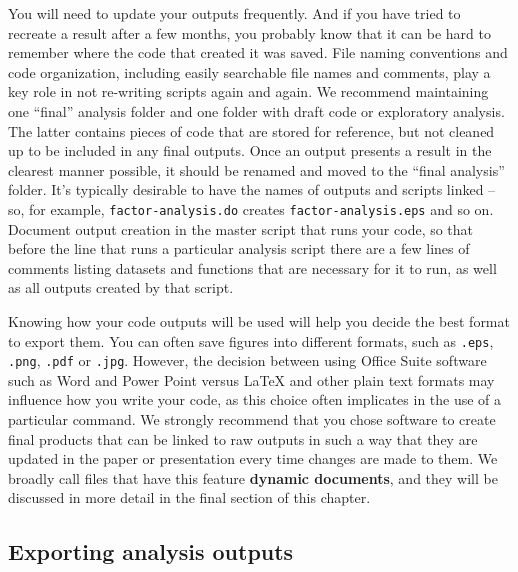 You will need to update your outputs frequently.
And if you have tried to recreate a result after a few months,
you probably know that it can be hard to remember where the code that created it was saved.
File naming conventions and code organization,
including easily searchable file names and comments,
play a key role in not re-writing scripts again and again.
We recommend maintaining one ``final'' analysis folder
and one folder with draft code or exploratory analysis.
The latter contains pieces of code that are stored for reference,
but not cleaned up to be included in any final outputs.
Once an output presents a result in the clearest manner possible,
it should be renamed and moved to the ``final analysis'' folder.
It's typically desirable to have the names of outputs and scripts linked --
so, for example, \texttt{factor-analysis.do} creates \texttt{factor-analysis.eps} and so on.
Document output creation in the master script that runs your code,
so that before the line that runs a particular analysis script
there are a few lines of comments listing
datasets and functions that are necessary for it to run,
as well as all outputs created by that script.

Knowing how your code outputs will be used will help you decide the best format to export them.
You can often save figures into different formats,
such as \texttt{.eps}, \texttt{.png}, \texttt{.pdf} or \texttt{.jpg}.
However, the decision between using Office Suite software such as Word and Power Point
versus {\LaTeX} and other plain text formats may influence how you write your code,
as this choice often implicates in the use of a particular command.
We strongly recommend that you chose software to create final products
that can be linked to raw outputs in such a way that they are updated
in the paper or presentation every time changes are made to them.
We broadly call files that have this feature \textbf{dynamic documents},
and they will be discussed in more detail in the final section of this chapter.


\subsection{Exporting analysis outputs}

